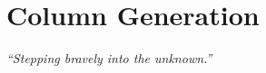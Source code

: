 








    \chapter{Column Generation}
        \begin{center}
            \textit{``Stepping bravely into the unknown.''}
        \end{center}

